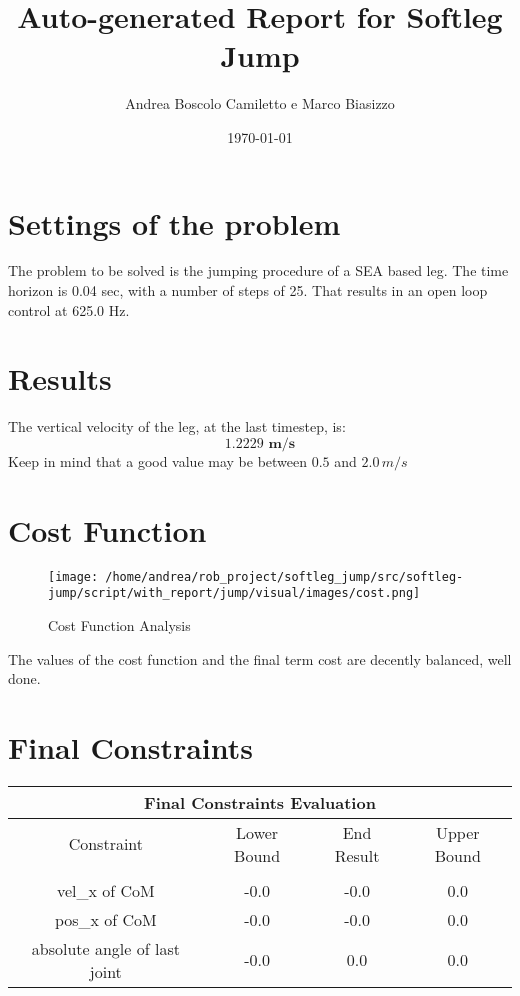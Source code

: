 \documentclass{article}%
\title{Auto{-}generated Report for Softleg Jump}%
\author{Andrea Boscolo Camiletto e Marco Biasizzo}%
\date{\today}%
\begin{document}
%
\normalsize%
\maketitle%
\section{Settings of the problem}%
\label{sec:Settingsoftheproblem}%
The problem to be solved is the jumping procedure of a SEA based leg.%
The time horizon is 0.04 sec, with a number of steps of 25. That results in an open loop control at 625.0 Hz.

%
\section{Results}%
\label{sec:Results}%
The vertical velocity of the leg, at the last timestep, is:%
\[%
\boldsymbol{1.2229\,\, m/s}%
\]%
Keep in mind that a good value may be between $0.5$ and $2.0 \, m/s$

%
\section{Cost Function}%
\label{sec:CostFunction}%


\begin{figure}[h!]%
\centering%
\texttt{[image: /home/andrea/rob\_project/softleg\_jump/src/softleg-jump/script/with\_report/jump/visual/images/cost.png]}%
\caption{Cost Function Analysis}%
\end{figure}

%
%
The values of the cost function and the final term cost are decently balanced, well done.

%
\pagebreak%
\section{Final Constraints}%
\label{sec:FinalConstraints}%
\begin{center}%
\begin{tabular}{c|c|c|c}%
\hline%
\multicolumn{4}{|c|}{Final Constraints Evaluation}\\%
\hline%
Constraint&Lower Bound&End Result&Upper Bound\\%
\hline%
&&&\\%
\multirow{1}{*}{vel\_x of CoM}&{-}0.0&{-}0.0&0.0\\%
\hline%
\multirow{1}{*}{pos\_x of CoM}&{-}0.0&{-}0.0&0.0\\%
\hline%
\multirow{1}{*}{absolute angle of last joint}&{-}0.0&0.0&0.0\\%
\hline%
\end{tabular}%
\end{center}
\end{document}

